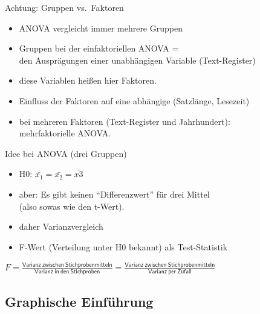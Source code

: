 \begin{frame}
  {Achtung: Gruppen vs.\ Faktoren}
  \begin{itemize}[<+->]
    \item ANOVA vergleicht immer \alert{mehrere Gruppen}
    \item Gruppen bei der einfaktoriellen ANOVA =\\
      den Ausprägungen \alert{einer unabhängigen Variable} (\zB Text-Register)
    \item diese Variablen heißen hier \alert{Faktoren}.
      \Zeile
    \item Einfluss der Faktoren auf \alert{eine abhängige} (\zB Satzlänge, Lesezeit)
      \Zeile
    \item bei mehreren Faktoren (\zB Text-Register und Jahrhundert):\\
      \alert{mehrfaktorielle ANOVA}.
  \end{itemize}
\end{frame}

\begin{frame}
  {Idee bei ANOVA (\zB drei Gruppen)}
  \begin{itemize}[<+->]
    \item \alert{H0: $\bar{x_1}=\bar{x_2}=\bar{x3}$}
    \item aber: \alert{Es gibt keinen ``Differenzwert'' für drei Mittel}\\
      (also sowas wie den t-Wert).
      \Zeile
    \item daher \alert{Varianzvergleich}
    \item \alert{F-Wert} (Verteilung unter H0 bekannt) als Test-Statistik
  \end{itemize}
  \pause
  \vspace{0.5cm}
  \begin{center}
    \alert{$F=\frac{\mathsf{Varianz\ zwischen\ Stichprobenmitteln}}{\mathsf{Varianz\ in\ den\ Stichproben}}=\frac{\mathsf{Varianz\ zwischen\ Stichprobenmitteln}}{\mathsf{Varianz\ per\ Zufall}}$}
  \end{center}
\end{frame}


\subsection{Graphische Einführung}

